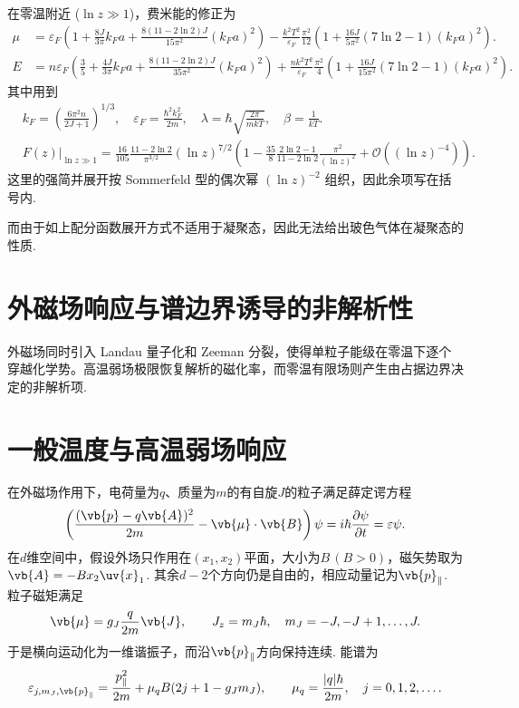 在零温附近 (\(\ln z \gg 1\))，费米能的修正为
\begin{align*}
	\mu &= \varepsilon_{F} \left( 1 + \frac{8J}{3\pi} k_{F} a + \frac{8(11 - 2\ln 2) J}{15\pi^{2}} (k_{F} a)^{2} \right) - \frac{k^{2} T^{2}}{\varepsilon_{F}} \frac{\pi^{2}}{12} \left( 1 + \frac{16J}{5\pi^{2}} (7\ln 2 - 1) (k_{F} a)^{2} \right). \\
	E &= n \varepsilon_{F} \left( \frac{3}{5} + \frac{4J}{3\pi} k_{F} a + \frac{8(11 - 2\ln 2) J}{35\pi^{2}} (k_{F} a)^{2} \right) + \frac{n k^{2} T^{2}}{\varepsilon_{F}} \frac{\pi^{2}}{4} \left( 1 + \frac{16J}{15\pi^{2}} (7\ln 2 - 1) (k_{F} a)^{2} \right).
\end{align*}
其中用到
\begin{align*}
	&k_{F} = \left( \frac{6\pi^{2} n}{2J+1} \right)^{1/3}, \quad \varepsilon_{F} = \frac{\hbar^{2} k_{F}^{2}}{2m}, \quad \lambda = \hbar \sqrt{\frac{2\pi}{m k T}}, \quad \beta = \frac{1}{kT}.\\
	&F(z) \big|_{\ln z \gg 1} = \frac{16}{105} \frac{11 - 2\ln 2}{\pi^{3/2}} (\ln z)^{7/2} \left( 1 - \frac{35}{8} \frac{2\ln 2 - 1}{11 - 2\ln 2} \frac{\pi^{2}}{(\ln z)^{2}} + \mathcal{O}\left((\ln z)^{-4}\right) \right).
\end{align*}
这里的强简并展开按 Sommerfeld 型的偶次幂 \( (\ln z)^{-2}\) 组织，因此余项写在括号内.

而由于如上配分函数展开方式不适用于凝聚态，因此无法给出玻色气体在凝聚态的性质.

\section{外磁场响应与谱边界诱导的非解析性}

外磁场同时引入 Landau 量子化和 Zeeman 分裂，使得单粒子能级在零温下逐个穿越化学势。高温弱场极限恢复解析的磁化率，而零温有限场则产生由占据边界决定的非解析项.

\section{一般温度与高温弱场响应}

在外磁场作用下，电荷量为\(q\)、质量为\(m\)的有自旋\(J\)的粒子满足薛定谔方程
\begin{align*}
	\left(\frac{(\vb{p}-q\vb{A})^{2}}{2m}-\vb{\mu}\cdot\vb{B}\right)\psi
	=i\hbar\frac{\partial\psi}{\partial t}
	=\varepsilon\psi .
\end{align*}
在\(d\)维空间中，假设外场只作用在\((x_{1},x_{2})\)平面，大小为\(B\,(B>0)\)，磁矢势取为\(\vb{A}=-Bx_{2}\uv{x}_{1}\). 其余\(d-2\)个方向仍是自由的，相应动量记为\(\vb{p}_{\parallel}\). 粒子磁矩满足
\begin{align*}
	\vb{\mu}=g_{J}\frac{q}{2m}\vb{J},
	\qquad
	J_{z}=m_{J}\hbar,
	\quad
	m_{J}=-J,-J+1,\ldots,J .
\end{align*}
于是横向运动化为一维谐振子，而沿\(\vb{p}_{\parallel}\)方向保持连续. 能谱为
\begin{align*}
	\varepsilon_{j,m_{J},\vb{p}_{\parallel}}
	=
	\frac{p_{\parallel}^{2}}{2m}
	+
	\mu_{q}B(2j+1-g_{J}m_{J}),
	\qquad
	\mu_{q}=\frac{|q|\hbar}{2m},
	\quad
	j=0,1,2,\ldots .
\end{align*}

